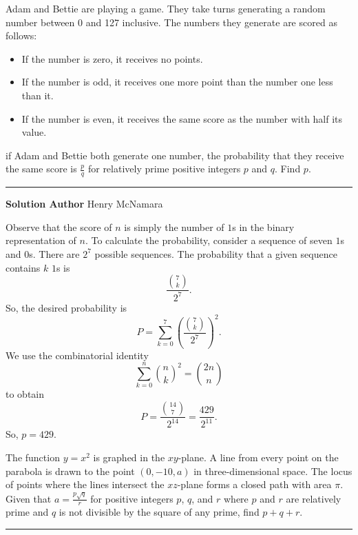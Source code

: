 \documentclass[11pt]{scrartcl}
\newcommand*{\problemfont}{\sffamily\bfseries}
\begin{document}
\begin{problem}
    Adam and Bettie are playing a game. They take turns generating a random number between 0 and 127 inclusive. The numbers they generate are scored as follows:
    \begin{itemize}
        \item If the number is zero, it receives no points.
        \item If the number is odd, it receives one more point than the number one less than it.
        \item If the number is even, it receives the same score as the number with half its value.
    \end{itemize}
    if Adam and Bettie both generate one number, the probability that they receive the same score is $\frac{p}{q}$ for relatively prime positive integers $p$ and $q$. Find $p$.
\end{problem}

\vspace{-\baselineskip}\rule{\textwidth}{0.4pt}

{\problemfont Solution Author} Henry McNamara

Observe that the score of $n$ is simply the number of $1$s in the binary representation of $n$. To calculate the probability, consider a sequence of seven $1$s and $0$s. There are $2^{7}$ possible sequences. The probability that a given sequence contains $k$ $1$s is
\[\frac{{7 \choose k}}{2^7}.\]
So, the desired probability is
\[P = \sum_{k = 0}^{7}\left(\frac{{7 \choose k}}{2^7}\right)^{2}.\]
We use the combinatorial identity
\[\sum_{k = 0}^{n} {n \choose k}^{2} = {2n \choose n}\]
to obtain
\[P = \frac{{14 \choose 7}}{2^{14}} = \frac{429}{2^{11}}.\]
So, $p = \boxed{429}$.

\pagebreak

\begin{problem}
    The function $y = x^{2}$ is graphed in the $xy$-plane. A line from every point on the parabola is drawn to the point $(0, -10, a)$ in three-dimensional space. The locus of points where the lines intersect the $xz$-plane forms a closed path with area $\pi$. Given that $a = \frac{p\sqrt{q}}{r}$ for positive integers $p$, $q$, and $r$ where $p$ and $r$ are relatively prime and $q$ is not divisible by the square of any prime, find $p + q + r$.
\end{problem}

\vspace{-\baselineskip}\rule{\textwidth}{0.4pt}
\end{document}
